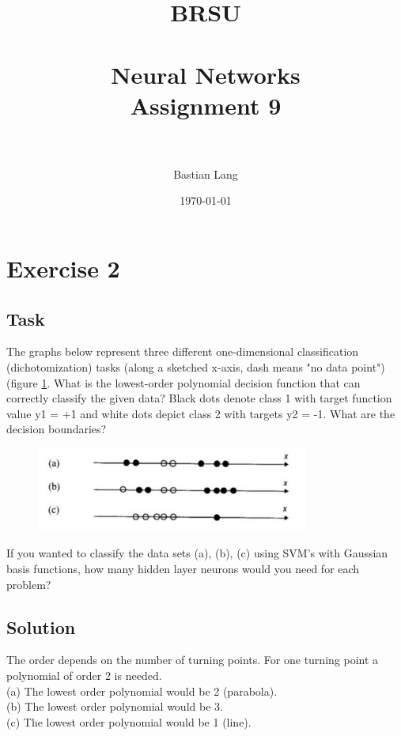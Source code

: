 \documentclass[paper=a4, fontsize=11pt]{scrartcl} %
\title{	
\normalfont \normalsize 
\textsc{BRSU} \\ [25pt] %
\horrule{0.5pt} \\[0.4cm] %
\huge Neural Networks\\Assignment 9 \\ %
\horrule{2pt} \\[0.5cm] %
}
\author{Bastian Lang} %
\date{\normalsize\today} %
\numberwithin{equation}{section} %
\numberwithin{figure}{section} %
\numberwithin{table}{section} %
\begin{document}
\maketitle %

\newpage



\section{Exercise 2}

\subsection{Task}
The graphs below represent three different one-dimensional classification
(dichotomization) tasks (along a sketched x-axis, dash means "no data point")(figure \ref{fig_ex2}.
What is the lowest-order polynomial decision function that can correctly classify the
given data? Black dots denote class 1 with target function value y1 = +1 and white dots
depict class 2 with targets y2 = -1. What are the decision boundaries?
\begin{figure}[H]
	\centering
  \includegraphics[width=0.8\textwidth]{exercise2.png}
	\caption{}
	\label{fig_ex2}
\end{figure}

If you wanted to classify the data sets (a), (b), (c) using SVM's with Gaussian basis
functions, how many hidden layer neurons would you need for each problem?

\subsection{Solution}
The order depends on the number of turning points. For one turning point a polynomial of order 2 is needed.\\
(a) The lowest order polynomial would be 2 (parabola).\\
(b) The lowest order polynomial would be 3.\\
(c) The lowest order polynomial would be 1 (line).\\
\end{document}

